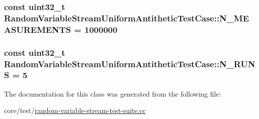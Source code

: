 \subsubsection[{\texorpdfstring{N\+\_\+\+M\+E\+A\+S\+U\+R\+E\+M\+E\+N\+TS}{N_MEASUREMENTS}}]{\setlength{\rightskip}{0pt plus 5cm}const uint32\+\_\+t Random\+Variable\+Stream\+Uniform\+Antithetic\+Test\+Case\+::\+N\+\_\+\+M\+E\+A\+S\+U\+R\+E\+M\+E\+N\+TS = 1000000\hspace{0.3cm}{\ttfamily [static]}}\hypertarget{classRandomVariableStreamUniformAntitheticTestCase_ae266badde024691eca523904beeb81f5}{}\label{classRandomVariableStreamUniformAntitheticTestCase_ae266badde024691eca523904beeb81f5}
\subsubsection[{\texorpdfstring{N\+\_\+\+R\+U\+NS}{N_RUNS}}]{\setlength{\rightskip}{0pt plus 5cm}const uint32\+\_\+t Random\+Variable\+Stream\+Uniform\+Antithetic\+Test\+Case\+::\+N\+\_\+\+R\+U\+NS = 5\hspace{0.3cm}{\ttfamily [static]}}\hypertarget{classRandomVariableStreamUniformAntitheticTestCase_a536a5cfa5a8c115b90bd28725552da65}{}\label{classRandomVariableStreamUniformAntitheticTestCase_a536a5cfa5a8c115b90bd28725552da65}


The documentation for this class was generated from the following file\+:\begin{DoxyCompactItemize}
\item 
core/test/\hyperlink{random-variable-stream-test-suite_8cc}{random-\/variable-\/stream-\/test-\/suite.\+cc}\end{DoxyCompactItemize}
